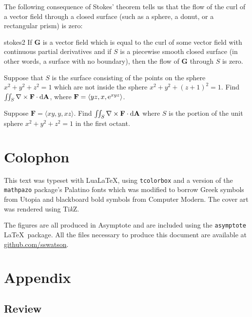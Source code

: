 \documentclass[prettycode,shellescape]{watsonbook}
\begin{document}
The following consequence of Stokes' theorem tells us that the flow
of the curl of a vector field through a closed surface (such as a
sphere, a donut, or a rectangular prism) is zero:

\begin{obs}{}{stokes2}
  If $\mathbf{G}$ is a vector field which is equal to the curl of
  some vector field with continuous partial derivatives and if $S$
  is a piecewise smooth closed surface (in other words, a surface
  with no boundary), then the flow of $\mathbf{G}$ through $S$ is
  zero.
\end{obs}

\begin{exercise}{}{}
  Suppose that $S$ is the surface consisting of the points on the
  sphere $x^2 + y^2 + z^2 = 1$ which are not inside the sphere
  $x^2 + y^2 + (z+1)^2 = 1$. Find $\iint_{S} \nabla \times \mathbf{F}
  \cdot \mathrm{d}\mathbf{A}$, where $\mathbf{F} = \langle yz, x, \mathrm{e}^{xyz}
  \rangle$. 
\end{exercise}

\begin{exercise}{}{}
  Suppose $\mathbf{F} = \langle xy, y, xz \rangle$. Find
  $\iint_S \nabla \times \mathbf{F} \cdot \mathrm{d}\mathbf{A}$ where $S$ is
  the portion of the unit sphere $x^2 + y^2 + z^2 = 1$ in the first
  octant.
\end{exercise}

\chapter*{Colophon}

This text was typeset with Lua\LaTeX, using \texttt{tcolorbox} and a version of the \texttt{mathpazo} package's Palatino fonts which was modified to borrow Greek symbols from Utopia and blackboard bold symbols from Computer Modern. The cover art was rendered using Ti\textit{k}Z. 

The figures are all produced in Asymptote and are included using the
\texttt{asymptote} \LaTeX\ package. All the files necessary to produce
this document are available at \url{github.com/sswatson}.

\appendix

\chapter{Appendix}

\section{Review} 
\end{document}
